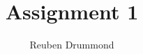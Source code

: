 \author{Reuben Drummond}
\title{Assignment 1}
\def\unitcode{CS341}
\def\unitname{Algorithms}
\def\studentnumber{21115217}